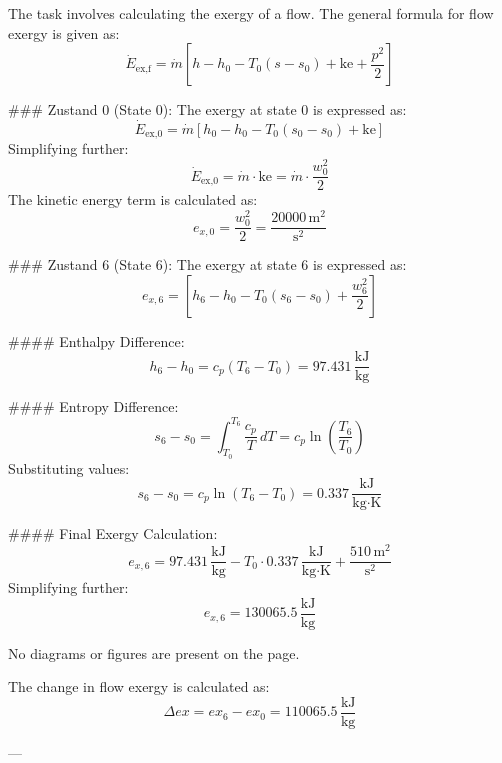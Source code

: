 The task involves calculating the exergy of a flow. The general formula for flow exergy is given as:  
\[
\dot{E}_{\text{ex,f}} = \dot{m} \left[ h - h_0 - T_0 (s - s_0) + \text{ke} + \frac{p^2}{2} \right]
\]

### Zustand 0 (State 0):  
The exergy at state 0 is expressed as:  
\[
\dot{E}_{\text{ex,0}} = \dot{m} \left[ h_0 - h_0 - T_0 (s_0 - s_0) + \text{ke} \right]
\]  
Simplifying further:  
\[
\dot{E}_{\text{ex,0}} = \dot{m} \cdot \text{ke} = \dot{m} \cdot \frac{w_0^2}{2}
\]  
The kinetic energy term is calculated as:  
\[
e_{x,0} = \frac{w_0^2}{2} = \frac{20000 \, \text{m}^2}{\text{s}^2}
\]

### Zustand 6 (State 6):  
The exergy at state 6 is expressed as:  
\[
e_{x,6} = \left[ h_6 - h_0 - T_0 (s_6 - s_0) + \frac{w_6^2}{2} \right]
\]  

#### Enthalpy Difference:  
\[
h_6 - h_0 = c_p (T_6 - T_0) = 97.431 \, \frac{\text{kJ}}{\text{kg}}
\]

#### Entropy Difference:  
\[
s_6 - s_0 = \int_{T_0}^{T_6} \frac{c_p}{T} \, dT = c_p \ln \left( \frac{T_6}{T_0} \right)
\]  
Substituting values:  
\[
s_6 - s_0 = c_p \ln \left( T_6 - T_0 \right) = 0.337 \, \frac{\text{kJ}}{\text{kg·K}}
\]

#### Final Exergy Calculation:  
\[
e_{x,6} = 97.431 \, \frac{\text{kJ}}{\text{kg}} - T_0 \cdot 0.337 \, \frac{\text{kJ}}{\text{kg·K}} + \frac{510 \, \text{m}^2}{\text{s}^2}
\]  
Simplifying further:  
\[
e_{x,6} = 130065.5 \, \frac{\text{kJ}}{\text{kg}}
\]  

No diagrams or figures are present on the page.

The change in flow exergy is calculated as:  
\[
\Delta ex = ex_6 - ex_0 = 110065.5 \, \frac{\text{kJ}}{\text{kg}}
\]

---
